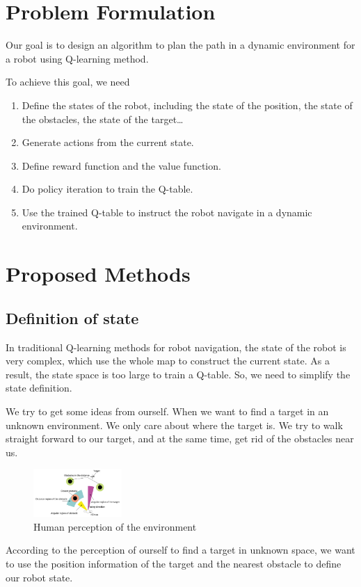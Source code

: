 \documentclass{acmtog} %
\begin{document}
\section{Problem Formulation}
Our goal is to design an algorithm to plan the path in a dynamic environment for a robot using Q-learning method.

To achieve this goal, we need
\begin{enumerate}
	\item Define the states of the robot, including the state of the position, the state of the obstacles, the state of the target…
	\item Generate actions from the current state.
	\item Define reward function and the value function.
	\item Do policy iteration to train the Q-table.
	\item Use the trained Q-table to instruct the robot navigate in a dynamic environment.
	
\end{enumerate}

\section{Proposed Methods}
\subsection{Definition of state}
In traditional Q-learning methods for robot navigation, the state of the robot is very complex, which use the whole map to construct the current state. As a result, the state space is too large to train a Q-table. So, we need to simplify the state definition.

We try to get some ideas from ourself. When we want to find a target in an unknown environment. We only care about where the target is. We try to walk straight forward to our target, and at the same time, get rid of the obstacles near us. 
\begin{figure}[H]
	\centering
	\includegraphics[width=0.3\textwidth]{hum.PNG}
	\caption{Human perception of the environment}
\end{figure}

According to the perception of ourself to find a target in unknown space, we want to use the position information of the target and the nearest obstacle to define our robot state.
\end{document}
